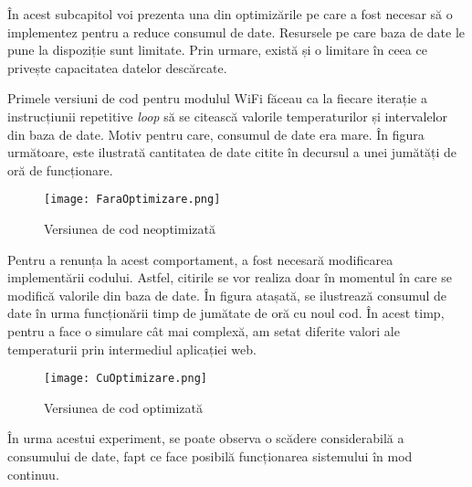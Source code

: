 	În acest subcapitol voi prezenta una din optimizările pe care a fost necesar să o implementez pentru a reduce consumul de date. Resursele pe care baza de date le pune la dispoziție sunt limitate. Prin urmare, există și o limitare în ceea ce privește capacitatea datelor descărcate.

	Primele versiuni de cod pentru modulul WiFi făceau ca la fiecare iterație a instrucțiunii repetitive \textit{loop} să se citească valorile temperaturilor și intervalelor din baza de date. Motiv pentru care, consumul de date era mare.  În figura următoare, este ilustrată cantitatea de date citite în decursul a unei jumătăți de oră de funcționare.
 
\begin{figure}[H]
   	\centering
    	\texttt{[image: FaraOptimizare.png]}
	\caption{Versiunea de cod neoptimizată}
\end{figure}

	Pentru a renunța la acest comportament, a fost necesară modificarea implementării codului. Astfel, citirile se vor realiza doar în momentul în care se modifică valorile din baza de date. În figura atașată, se ilustrează consumul de date în urma funcționării timp de jumătate de oră cu noul cod. În acest timp, pentru a face o simulare cât mai complexă, am setat diferite valori ale temperaturii prin intermediul aplicației web. 

\begin{figure}[H]
   	\centering
    	\texttt{[image: CuOptimizare.png]}
	\caption{Versiunea de cod optimizată}
\end{figure}

	În urma acestui experiment, se poate observa o scădere considerabilă a consumului de date, fapt ce face posibilă funcționarea sistemului în mod continuu. 

